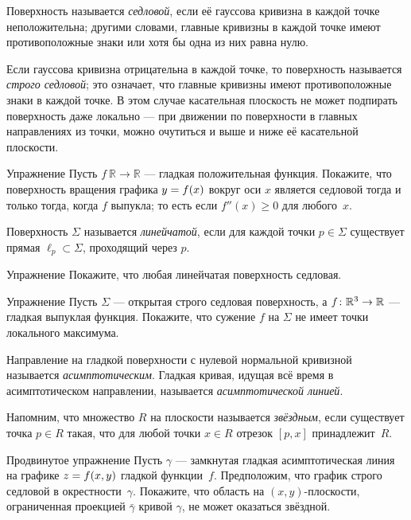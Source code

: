Поверхность называется \emph{седловой}, если её гауссова кривизна в каждой точке неположительна;
другими словами, главные кривизны в каждой точке имеют противоположные знаки или хотя бы одна из них равна нулю.

Если гауссова кривизна отрицательна в каждой точке,
то поверхность называется {}\emph{строго седловой};
это означает, что главные кривизны имеют противоположные знаки в каждой точке.
В этом случае касательная плоскость не может подпирать поверхность даже локально --- при движении по поверхности в главных направлениях из точки, можно очутиться и выше и ниже её касательной плоскости.

\begin{thm}{Упражнение}\label{ex:convex-revolution}
Пусть $f\:\mathbb{R}\to\mathbb{R}$ --- гладкая положительная функция.
Покажите, что поверхность вращения графика $y\z=f(x)$ вокруг оси $x$
является седловой тогда и только тогда, когда $f$ выпукла; то есть если $f''(x)\ge0$ для любого~$x$.
\end{thm}

Поверхность $\Sigma$ называется \emph{линейчатой}, если для каждой точки $p\in \Sigma$ существует прямая $\ell_p\subset \Sigma$, проходящий через $p$.

\begin{thm}{Упражнение}\label{ex:ruled=>saddle}
Покажите, что любая линейчатая поверхность седловая.
\end{thm}

\begin{thm}{Упражнение}\label{ex:saddle-convex}
Пусть $\Sigma$ --- открытая строго седловая поверхность, а $f\:\mathbb{R}^3\z\to\mathbb{R}$ --- гладкая выпуклая функция.
Покажите, что сужение $f$ на $\Sigma$ не имеет точки локального максимума.
\end{thm}


Направление на гладкой поверхности с нулевой нормальной кривизной называется \emph{асимптотическим}.
Гладкая кривая, идущая всё время в асимптотическом направлении, называется
{}\emph{асимптотической линией}.\label{page:asymptotic line}

Напомним, что множество $R$ на плоскости называется \emph{звёздным}, если существует точка $p\in R$ такая, что для любой точки $x\in R$ отрезок $[p,x]$ принадлежит~$R$.

\begin{thm}{Продвинутое упражнение}\label{ex:panov}
Пусть $\gamma$ --- замкнутая гладкая асимптотическая линия
на графике $z\z=f(x,y)$ гладкой функции~$f$. 
Предположим, что график строго седловой в окрестности~$\gamma$.
Покажите, что область на $(x,y)$-плоскости, ограниченная проекцией $\bar \gamma$ кривой $\gamma$, не может оказаться звёздной. 
\end{thm}

